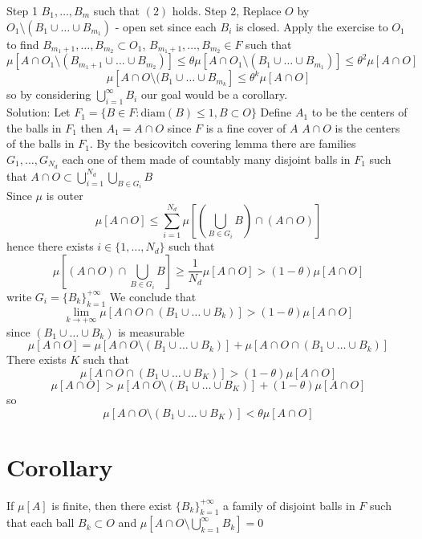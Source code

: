 \documentclass[11pt]{article}
\begin{document}
Step 1 $B_1,\dots, B_m$ such that $(2)$ holds.
Step 2, Replace $O$ by  $O_1 \setminus ( B_1 \cup \dots \cup B_{m_1}) $ - open set since each $B_i$ is closed.
Apply the exercise to $O_1$ to find $B_{m_1+1},\dots,B_{m_2} \subset O_1$, $B_{m_1+1},\dots,B_{m_2} \in F$ such that
\[
    \mu[A \cap O_1 \setminus(B_{m_1+1}\cup\dots\cup B_{m_2})] \le \theta \mu[A \cap O_1 \setminus (B_1\cup\dots\cup B_{m_1})] \le \theta^2 \mu[A \cap O]
\] 
\[
    \mu[A \cap O \setminus (B_1\cup\dots\cup B_{m_k}] \le \theta^{k}\mu[A \cap O]
\] 
so by considering $\bigcup_{i=1}^{\infty}B_i$ our goal would be a corollary.
\\
Solution: Let $F_1 = \{ B \in F: \text{diam}(B) \le 1, B \subset O\}$ Define $A_1$ to be the centers of the balls in $F_1$ then $A_1 = A \cap O$ since $F$ is a fine cover of  $A$
$A \cap O$ is the centers of the balls in $F_1$. By the
besicovitch covering lemma there are families $G_1,\dots,G_{N_d}$ each one of them made of countably many disjoint balls in $F_1$ such that
$A \cap O \subset \bigcup_{i=1}^{N_d} \bigcup_{B \in G_i} B$ \\
Since $\mu$ is outer
\[
 \mu[A \cap O] \le \sum_{i=1}^{N_d} \mu\left[(\bigcup_{B \in G_i} B) \cap (A \cap O) \right]
\] 
hence there exists $i \in \{1,\dots,N_d\}$ such that 
\[
  \mu[(A \cap O) \cap \bigcup_{B \in G_i} B] \ge \frac{1}{N_d} \mu[A \cap O] > (1-\theta) \mu[A \cap O]
\] 
write $G_i = \{B_k\}_{k=1}^{+\infty}$ 
We conclude that
\[
    \lim_{k\to +\infty} \mu[A \cap O \cap (B_1 \cup\dots\cup B_k)] > (1-\theta) \mu[A \cap O]
\] 
since  $(B_1 \cup \dots \cup B_k)$ is measurable
\[
    \mu[A \cap O] = \mu[A \cap O \setminus (B_1 \cup \dots \cup B_k )] + \mu[A \cap O \cap (B_1 \cup \dots \cup B_k)]
\] 
There exists $K$ such that
 \[
     \mu[A \cap O \cap (B_1 \cup \dots \cup B_K)] > (1-\theta) \mu[A \cap O]
\] 
\[
    \mu[A \cap O] > \mu[A \cap O \setminus (B_1 \cup \dots \cup B_K)] + (1-\theta)\mu[A \cap O]
\] 
so
\[
    \mu[A \cap O \setminus(B_1 \cup \dots \cup B_K)] < \theta \mu[A \cap O]
\] 

\section{Corollary}
If $\mu[A]$ is finite, then there exist $\{B_k\}_{k=1}^{+\infty} $ a family of disjoint balls in $F$ such that each ball  $B_k \subset O$ and
$\mu[A \cap O \setminus \bigcup_{k=1}^{\infty}B_k] = 0 $
\end{document}
